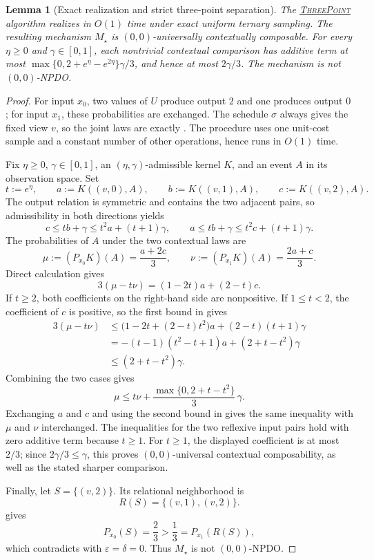 \documentclass[11pt]{article}
\newtheorem{lemma}{Lemma}[section]
\begin{document}
\begin{lemma}[Exact realization and strict three-point separation]
\label{lem:separation}
The \hyperref[alg:three-point]{\textsc{ThreePoint}} algorithm realizes
 in $O(1)$ time under exact uniform ternary sampling.
The resulting mechanism $M_\star$ is $(0,0)$-universally contextually
composable.  For every $\eta\geq0$ and $\gamma\in[0,1]$, each nontrivial
contextual comparison has additive term at most
$\max\{0,2+e^\eta-e^{2\eta}\}\gamma/3$, and hence at most $2\gamma/3$.
The mechanism is not $(0,0)$-NPDO.
\end{lemma}

\begin{proof}
For input $x_0$, two values of $U$ produce output $2$ and one produces output
$0$; for input $x_1$, these probabilities are exchanged.  The schedule
$\sigma$ always gives the fixed view $v$, so the joint laws are exactly
.  The procedure uses one unit-cost sample and a
constant number of other operations, hence runs in $O(1)$ time.

Fix $\eta\geq0$, $\gamma\in[0,1]$, an $(\eta,\gamma)$-admissible kernel $K$,
and an event $A$ in its observation space.  Set
\[
 t:=e^\eta,\qquad
 a:=K((v,0),A),\qquad
 b:=K((v,1),A),\qquad
 c:=K((v,2),A).
\]
The output relation is symmetric and contains the two adjacent pairs, so
admissibility in both directions yields
\begin{equation}
 c\leq tb+\gamma\leq t^2a+(t+1)\gamma,
 \qquad
 a\leq tb+\gamma\leq t^2c+(t+1)\gamma.
 \label{eq:two-hop}
\end{equation}
The probabilities of $A$ under the two contextual laws are
\[
 \mu:=(P_{x_0}K)(A)=\frac{a+2c}{3},
 \qquad
 \nu:=(P_{x_1}K)(A)=\frac{2a+c}{3}.
\]
Direct calculation gives
\begin{equation}
 3(\mu-t\nu)=(1-2t)a+(2-t)c.
 \label{eq:endpoint-difference}
\end{equation}
If $t\geq2$, both coefficients on the right-hand side are nonpositive.  If
$1\leq t<2$, the coefficient of $c$ is positive, so the first bound in
 gives
\begin{align*}
 3(\mu-t\nu)
 &\leq \bigl(1-2t+(2-t)t^2\bigr)a+(2-t)(t+1)\gamma\\
 &=- (t-1)(t^2-t+1)a+(2+t-t^2)\gamma\\
 &\leq(2+t-t^2)\gamma.
\end{align*}
Combining the two cases gives
\[
 \mu\leq t\nu+\frac{\max\{0,2+t-t^2\}}{3}\,\gamma.
\]
Exchanging $a$ and $c$ and using the second bound in  gives
the same inequality with $\mu$ and $\nu$ interchanged.  The inequalities for
the two reflexive input pairs hold with zero additive term because $t\geq1$.
For $t\geq1$, the displayed coefficient is at most $2/3$; since
$2\gamma/3\leq\gamma$, this proves $(0,0)$-universal contextual
composability, as well as the stated sharper comparison.

Finally, let $S=\{(v,2)\}$.  Its relational neighborhood is
\[
 R(S)=\{(v,1),(v,2)\}.
\]
 gives
\[
 P_{x_0}(S)=\frac23>\frac13=P_{x_1}(R(S)),
\]
which contradicts  with $\varepsilon=\delta=0$.  Thus
$M_\star$ is not $(0,0)$-NPDO.
\end{proof}
\end{document}
